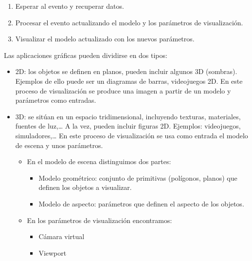 \documentclass[12pt]{book} %
\providecommand{\tightlist}{%
  \setlength{\itemsep}{0pt}\setlength{\parskip}{0pt}}
\begin{document}
\begin{enumerate}
\def\labelenumi{\arabic{enumi}.}
\tightlist
\item
  Esperar al evento y recuperar datos.\\
\item
  Procesar el evento actualizando el modelo y los parámetros de
  visualización.\\
\item
  Visualizar el modelo actualizado con los nuevos parámetros.
\end{enumerate}

Las aplicaciones gráficas pueden dividirse en dos tipos:

\begin{itemize}
\tightlist
\item
  2D: los objetos se definen en planos, pueden incluir algunos 3D
  (sombras). Ejemplos de ello puede ser un diagramas de barras,
  videojuegos 2D. En este proceso de visualización se produce una imagen
  a partir de un modelo y parámetros como entradas.\\
\item
  3D: se sitúan en un espacio tridimensional, incluyendo texturas,
  materiales, fuentes de luz,\ldots{} A la vez, pueden incluir figuras
  2D. Ejemplos: videojuegos, simuladores,\ldots{} En este proceso de
  visualización se usa como entrada el modelo de escena y unos
  parámetros.

  \begin{itemize}
  \tightlist
  \item
    En el modelo de escena distinguimos dos partes:

    \begin{itemize}
    \tightlist
    \item
      Modelo geométrico: conjunto de primitivas (polígonos, planos) que
      definen los objetos a visualizar.\\
    \item
      Modelo de aspecto: parámetros que definen el aspecto de los
      objetos.\\
    \end{itemize}
  \item
    En los parámetros de visualización encontramos:

    \begin{itemize}
    \tightlist
    \item
      Cámara virtual\\
    \item
      Viewport
    \end{itemize}
  \end{itemize}
\end{itemize}
\end{document}
